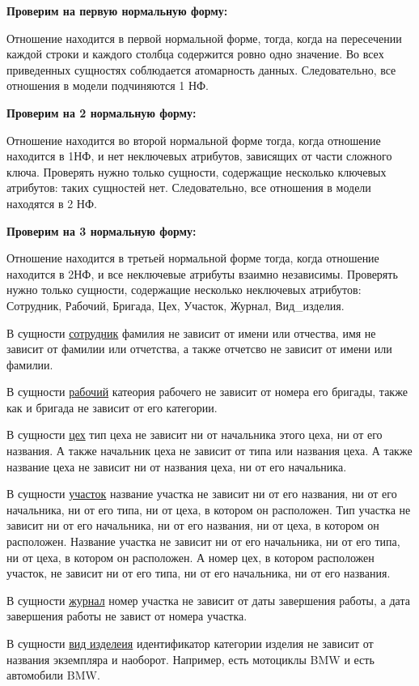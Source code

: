 {\bf Проверим на первую нормальную форму:}

Отношение находится в первой нормальной форме, тогда, когда на пересечении каждой строки и каждого столбца содержится ровно одно значение.
Во всех приведенных сущностях соблюдается атомарность данных.
Следовательно, все отношения в модели подчиняются 1 НФ.

{\bf Проверим на 2 нормальную форму:}

Отношение находится во второй нормальной форме тогда, когда отношение находится в 1НФ, и нет неключевых атрибутов, зависящих от части сложного ключа.
Проверять нужно только сущности, содержащие несколько ключевых атрибутов: таких сущностей нет.
Следовательно, все отношения в модели находятся в 2 НФ.

{\bf Проверим на 3 нормальную форму:}

Отношение находится в третьей нормальной форме тогда, когда отношение находится в 2НФ, и все неключевые атрибуты взаимно независимы.
Проверять нужно только сущности, содержащие несколько неключевых атрибутов:
Сотрудник, Рабочий, Бригада, Цех, Участок, Журнал, Вид\_изделия.

В сущности \underline{сотрудник} фамилия не зависит от имени или отчества, имя не зависит от фамилии или отчетства, а также отчетсво не зависит от имени или фамилии.

В сущности \underline{рабочий} катеория рабочего не зависит от номера его бригады, также как и бригада не зависит от его категории.

В сущности \underline{цех} тип цеха не зависит ни от начальника этого цеха, ни от его названия.
А также начальник цеха не зависит от типа или названия цеха.
А также название цеха не зависит ни от названия цеха, ни от его начальника.

В сущности \underline{участок} название участка не зависит ни от его названия, ни от его начальника, ни от его типа, ни от цеха, в котором он расположен.
Тип участка не зависит ни от его начальника, ни от его названия, ни от цеха, в котором он расположен.
Название участка не зависит ни от его начальника, ни от его типа, ни от цеха, в котором он расположен.
А номер цех, в котором расположен участок, не зависит ни от его типа, ни от его начальника, ни от его названия.

В сущности \underline{журнал} номер участка не зависит от даты завершения работы, а дата завершения работы не завист от номера участка.

В сущности \underline{вид изделеия} идентификатор категории изделия не зависит от названия экземпляра и наоборот.
Например, есть мотоциклы BMW и есть автомобили BMW.

